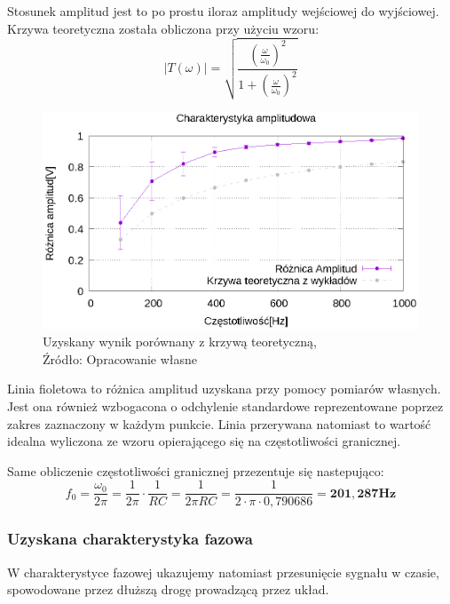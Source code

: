 \documentclass{article}
\begin{document}
        Stosunek amplitud jest to po prostu iloraz amplitudy wejściowej do wyjściowej. Krzywa teoretyczna została obliczona przy użyciu wzoru:
        \begin{equation}
          |T(\omega)| = \sqrt{\frac{(\frac{\omega}{\omega_0})^2}{1+(\frac{\omega}{\omega_0})^2}}
        \end{equation}

        \pagebreak

        \begin{figure}[!ht]
          \centering
          \includegraphics[scale=0.75]{grafiki/1_amp_plot.eps}
          \caption{Uzyskany wynik porównany z krzywą teoretyczną,
              \\Źródło: Opracowanie własne}
        \end{figure}

       Linia fioletowa to różnica amplitud uzyskana przy pomocy pomiarów własnych. Jest ona również wzbogacona o odchylenie standardowe reprezentowane poprzez zakres zaznaczony w każdym punkcie. Linia przerywana natomiast to wartość idealna wyliczona ze wzoru opierającego się na częstotliwości granicznej.

       Same obliczenie częstotliwości granicznej przezentuje się nastepująco:
       \begin{equation}
        f_0 = \frac{\omega_0}{2\pi} = \frac{1}{2\pi} \cdot \frac{1}{RC} = \frac{1}{2 \pi RC} = \frac{1}{2 \cdot \pi \cdot 0,790686} = \mathbf{201,287 Hz}
       \end{equation}

      \subsubsection{Uzyskana charakterystyka fazowa}
        W charakterystyce fazowej ukazujemy natomiast przesunięcie sygnału w czasie, spowodowane przez dłuższą drogę prowadzącą przez układ.
        
\end{document}

